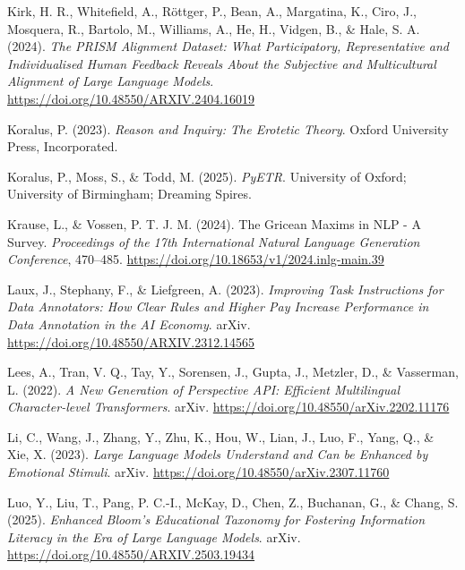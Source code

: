 \documentclass[
  12pt,
]{article}
\newlength{\cslhangindent}
\newenvironment{CSLReferences}[2] %
 {\begin{list}{}{%
  \setlength{\itemindent}{0pt}
  \setlength{\leftmargin}{0pt}
  \setlength{\parsep}{0pt}
  \ifodd #1
   \setlength{\leftmargin}{\cslhangindent}
   \setlength{\itemindent}{-1\cslhangindent}
  \fi
  \setlength{\itemsep}{#2\baselineskip}}}
 {\end{list}}
\begin{document}
\begin{CSLReferences}{1}{0}
Kirk, H. R., Whitefield, A., Röttger, P., Bean, A., Margatina, K., Ciro, J., Mosquera, R., Bartolo, M., Williams, A., He, H., Vidgen, B., \& Hale, S. A. (2024). \emph{The {PRISM} {Alignment} {Dataset}: {What} {Participatory}, {Representative} and {Individualised} {Human} {Feedback} {Reveals} {About} the {Subjective} and {Multicultural} {Alignment} of {Large} {Language} {Models}}. \url{https://doi.org/10.48550/ARXIV.2404.16019}

Koralus, P. (2023). \emph{Reason and {Inquiry}: {The} {Erotetic} {Theory}}. Oxford University Press, Incorporated.

Koralus, P., Moss, S., \& Todd, M. (2025). \emph{{PyETR}}. University of Oxford; University of Birmingham; Dreaming Spires.

Krause, L., \& Vossen, P. T. J. M. (2024). The {Gricean} {Maxims} in {NLP} - {A} {Survey}. \emph{Proceedings of the 17th {International} {Natural} {Language} {Generation} {Conference}}, 470--485. \url{https://doi.org/10.18653/v1/2024.inlg-main.39}

Laux, J., Stephany, F., \& Liefgreen, A. (2023). \emph{Improving {Task} {Instructions} for {Data} {Annotators}: {How} {Clear} {Rules} and {Higher} {Pay} {Increase} {Performance} in {Data} {Annotation} in the {AI} {Economy}}. arXiv. \url{https://doi.org/10.48550/ARXIV.2312.14565}

Lees, A., Tran, V. Q., Tay, Y., Sorensen, J., Gupta, J., Metzler, D., \& Vasserman, L. (2022). \emph{A {New} {Generation} of {Perspective} {API}: {Efficient} {Multilingual} {Character}-level {Transformers}}. arXiv. \url{https://doi.org/10.48550/arXiv.2202.11176}

Li, C., Wang, J., Zhang, Y., Zhu, K., Hou, W., Lian, J., Luo, F., Yang, Q., \& Xie, X. (2023). \emph{Large {Language} {Models} {Understand} and {Can} be {Enhanced} by {Emotional} {Stimuli}}. arXiv. \url{https://doi.org/10.48550/arXiv.2307.11760}

Luo, Y., Liu, T., Pang, P. C.-I., McKay, D., Chen, Z., Buchanan, G., \& Chang, S. (2025). \emph{Enhanced {Bloom}'s {Educational} {Taxonomy} for {Fostering} {Information} {Literacy} in the {Era} of {Large} {Language} {Models}}. arXiv. \url{https://doi.org/10.48550/ARXIV.2503.19434}


\end{CSLReferences}
\end{document}
